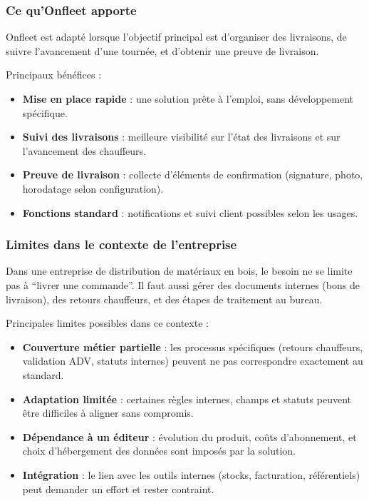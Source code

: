 \documentclass[12pt,a4paper]{article}
\begin{document}
    \subsubsection{Ce qu'Onfleet apporte}
    Onfleet est adapté lorsque l'objectif principal est d'organiser des livraisons, de suivre l'avancement d'une tournée, et d'obtenir une preuve de livraison.

    Principaux bénéfices :
    \begin{itemize}[leftmargin=1.2em]
    \item \textbf{Mise en place rapide} : une solution prête à l'emploi, sans développement spécifique.
    \item \textbf{Suivi des livraisons} : meilleure visibilité sur l'état des livraisons et sur l'avancement des chauffeurs.
    \item \textbf{Preuve de livraison} : collecte d'éléments de confirmation (signature, photo, horodatage selon configuration).
    \item \textbf{Fonctions standard} : notifications et suivi client possibles selon les usages.
    \end{itemize}

    \subsubsection{Limites dans le contexte de l'entreprise}
    Dans une entreprise de distribution de matériaux en bois, le besoin ne se limite pas à ``livrer une commande''. Il faut aussi gérer des documents internes (bons de livraison), des retours chauffeurs, et des étapes de traitement au bureau.

    Principales limites possibles dans ce contexte :
    \begin{itemize}[leftmargin=1.2em]
    \item \textbf{Couverture métier partielle} : les processus spécifiques (retours chauffeurs, validation ADV, statuts internes) peuvent ne pas correspondre exactement au standard.
    \item \textbf{Adaptation limitée} : certaines règles internes, champs et statuts peuvent être difficiles à aligner sans compromis.
    \item \textbf{Dépendance à un éditeur} : évolution du produit, coûts d'abonnement, et choix d'hébergement des données sont imposés par la solution.
    \item \textbf{Intégration} : le lien avec les outils internes (stocks, facturation, référentiels) peut demander un effort et rester contraint.
    \end{itemize}
\end{document}
